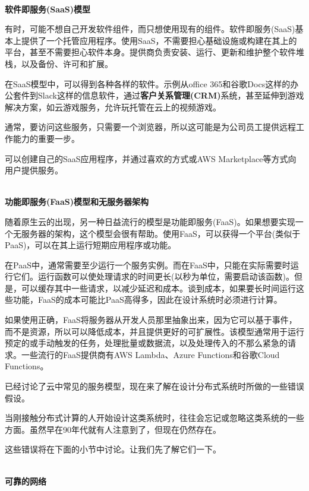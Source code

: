 \hspace*{\fill} \\ %
\noindent
\textbf{软件即服务(SaaS)模型}

有时，可能不想自己开发软件组件，而只想使用现有的组件。软件即服务(SaaS)基本上提供了一个托管应用程序。使用SaaS，不需要担心基础设施或构建在其上的平台，甚至不需要担心软件本身。提供商负责安装、运行、更新和维护整个软件堆栈，以及备份、许可和扩展。

在SaaS模型中，可以得到各种各样的软件。示例从office 365和谷歌Docs这样的办公套件到Slack这样的信息软件，通过\textbf{客户关系管理(CRM)}系统，甚至延伸到游戏解决方案，如云游戏服务，允许玩托管在云上的视频游戏。

通常，要访问这些服务，只需要一个浏览器，所以这可能是为公司员工提供远程工作能力的重要一步。

可以创建自己的SaaS应用程序，并通过喜欢的方式或AWS Marketplace等方式向用户提供服务。

\hspace*{\fill} \\ %
\noindent
\textbf{功能即服务(FaaS)模型和无服务器架构}

随着原生云的出现，另一种日益流行的模型是功能即服务(FaaS)。如果想要实现一个无服务器的架构，这个模型会很有帮助。使用FaaS，可以获得一个平台(类似于PaaS)，可以在其上运行短期应用程序或功能。

在PaaS中，通常需要至少运行一个服务实例。而在FaaS中，只能在实际需要时运行它们。运行函数可以使处理请求的时间更长(以秒为单位，需要启动该函数)。但是，可以缓存其中一些请求，以减少延迟和成本。谈到成本，如果要长时间运行这些功能，FaaS的成本可能比PaaS高得多，因此在设计系统时必须进行计算。

如果使用正确，FaaS将服务器从开发人员那里抽象出来，因为它可以基于事件，而不是资源，所以可以降低成本，并且提供更好的可扩展性。该模型通常用于运行预定的或手动触发的任务，处理批量或数据流，以及处理传入的不那么紧急的请求。一些流行的FaaS提供商有AWS Lambda、Azure Functions和谷歌Cloud Functions。

已经讨论了云中常见的服务模型，现在来了解在设计分布式系统时所做的一些错误假设。


当刚接触分布式计算的人开始设计这类系统时，往往会忘记或忽略这类系统的一些方面。虽然早在90年代就有人注意到了，但现在仍然存在。

这些错误将在下面的小节中讨论。让我们先了解它们一下。

\hspace*{\fill} \\ %
\noindent
\textbf{可靠的网络}

